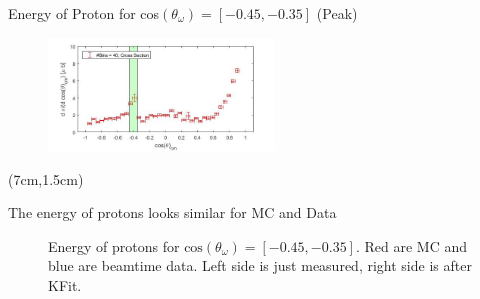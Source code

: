 \documentclass[
		10pt
		]{beamer}
\begin{document}
\begin{frame}{Energy of Proton for cos$(\theta_{\omega})=[-0.45,-0.35]$ (Peak)}

	
	\begin{figure}
		\hspace{-5.9cm}  \vspace{-0.9cm}
		\includegraphics[width=6cm]{Plots/6}
	\end{figure}



\begin{textblock*}{5.5cm}(7cm,1.5cm)
	\small

	The energy of protons looks similar for MC and Data  

\end{textblock*}



\begin{figure}%
	\begin{center}

	\qquad
	
	\captionsetup{labelformat=empty}	
	\caption{Energy of protons for $\textrm{cos}(\theta_{\omega}) = [-0.45, -0.35] $. Red are MC and blue are beamtime data. Left side is just measured, right side is after KFit.}%
	
\end{center}
	
\end{figure}





	
\end{frame}
\end{document}
